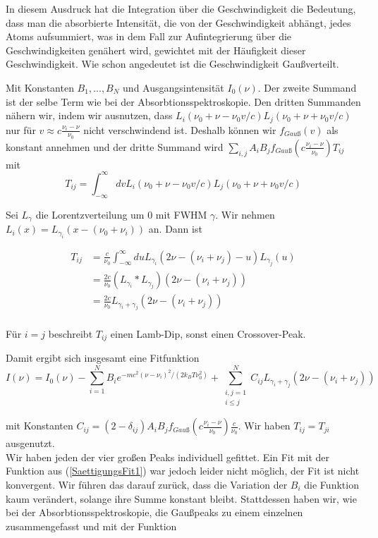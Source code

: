 \documentclass[a4paper,parskip]{scrartcl}
\begin{document}
In diesem Ausdruck hat die Integration über die Geschwindigkeit die Bedeutung, dass man die absorbierte Intensität, die von der Geschwindigkeit abhängt, jedes Atoms aufsummiert, was in dem Fall zur Aufintegrierung über die Geschwindigkeiten genähert wird, gewichtet mit der Häufigkeit dieser Geschwindigkeit. Wie schon angedeutet ist die Geschwindigkeit Gaußverteilt.

Mit Konstanten $B_1, ..., B_N$ und Ausgangsintensität $I_0(\nu)$. Der zweite Summand ist der selbe Term wie bei der Absorbtionsspektroskopie. Den dritten Summanden nähern wir, indem wir ausnutzen, dass  $L_i(\nu_0+\nu-\nu_0 v/c) L_j(\nu_0+\nu+\nu_0 v/c)$ nur für $v \approx c \frac{\nu_i-\nu}{\nu_0}$ nicht verschwindend ist. Deshalb können wir $f_{Gauß}(v)$ als konstant annehmen und der dritte Summand wird $\sum_{i,j} A_iB_j f_{Gauß}(c \frac{\nu_i-\nu}{\nu_0}) T_{ij}$ mit
$$T_{ij}=\int_{-\infty}^\infty dv L_i(\nu_0+\nu-\nu_0 v/c) L_j(\nu_0+\nu+\nu_0 v/c)$$


Sei $L_\gamma$ die Lorentzverteilung um 0 mit FWHM $\gamma$. Wir nehmen $L_i(x) = L_{\gamma_i}(x-(\nu_0+\nu_i))$ an. Dann ist

\begin{align*}
T_{ij} &= \frac{c}{\nu_0}\int_{-\infty}^\infty du L_{\gamma_i}(2\nu-(\nu_i+\nu_j)-u)L_{\gamma_j}(u)\\
&= \frac{2c}{\nu_0} (L_{\gamma_i} * L_{\gamma_j})(2\nu-(\nu_i+\nu_j)) \\
&= \frac{2c}{\nu_0} L_{\gamma_i+\gamma_j}(2\nu-(\nu_i+\nu_j)) \\
\end{align*}

Für $i=j$ beschreibt $T_{ij}$ einen Lamb-Dip, sonst einen Crossover-Peak. 

Damit ergibt sich insgesamt eine Fitfunktion
\begin{equation}
I(\nu) = I_0(\nu)-\sum_{i=1}^N B_i e^{-mc^2(\nu-\nu_i)^2/(2k_BT\nu_0^2)} +\sum_{\substack{i,j=1\\i\leq j}}^N C_{ij} L_{\gamma_i+\gamma_j}(2\nu-(\nu_i+\nu_j))
\label{SaettigungsFit1}
\end{equation}


mit Konstanten $C_{ij} = (2-\delta_{ij})A_iB_jf_{Gauß}(c \frac{\nu_i-\nu}{\nu_0})\frac{c}{\nu_0}$. Wir haben $T_{ij}=T_{ji}$ ausgenutzt.\\

Wir haben jeden der vier großen Peaks individuell gefittet. Ein Fit mit der Funktion aus (\ref{SaettigungsFit1}) war jedoch leider nicht möglich, der Fit ist nicht konvergent. Wir führen das darauf zurück, dass die Variation der $B_i$ die Funktion kaum verändert, solange ihre Summe konstant bleibt. Stattdessen haben wir, wie bei der Absorbtionsspektroskopie, die Gaußpeaks zu einem einzelnen zusammengefasst und mit der Funktion
\end{document}
